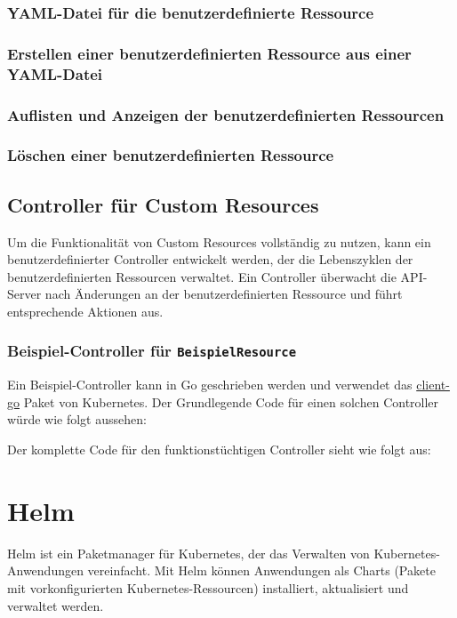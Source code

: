\subsubsection{YAML-Datei für die benutzerdefinierte Ressource}


\subsubsection{Erstellen einer benutzerdefinierten Ressource aus einer YAML-Datei}


\subsubsection{Auflisten und Anzeigen der benutzerdefinierten Ressourcen}


\subsubsection{Löschen einer benutzerdefinierten Ressource}

\newpage
\subsection{Controller für Custom Resources}
Um die Funktionalität von Custom Resources vollständig zu nutzen, kann ein benutzerdefinierter Controller entwickelt werden, der die Lebenszyklen der benutzerdefinierten Ressourcen verwaltet. Ein Controller überwacht die API-Server nach Änderungen an der benutzerdefinierten Ressource und führt entsprechende Aktionen aus.

\subsubsection{Beispiel-Controller für \texttt{BeispielResource}}
Ein Beispiel-Controller kann in Go geschrieben werden und verwendet das \href{https://github.com/kubernetes/client-go}{client-go} Paket von Kubernetes. Der Grundlegende Code für einen solchen Controller würde wie folgt aussehen:

\newpage
\noindent
Der komplette Code für den funktionstüchtigen Controller sieht wie folgt aus:


\newpage
\section{Helm}
Helm ist ein Paketmanager für Kubernetes, der das Verwalten von Kubernetes-Anwendungen vereinfacht. Mit Helm können Anwendungen als Charts (Pakete mit vorkonfigurierten Kubernetes-Ressourcen) installiert, aktualisiert und verwaltet werden.\\

